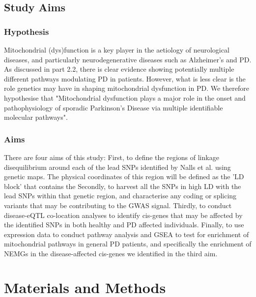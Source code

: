 \documentclass{article}
\begin{document}
\subsection{Study Aims}
\subsubsection{Hypothesis}
Mitochondrial (dys)function is a key player in the aetiology of neurological diseases\cite{Bartman2024MitochondrialDiseases}, and particularly neurodegenerative diseases such as Alzheimer's and PD\cite{MonzioCompagnoni2020TheDisease}. As discussed in part 2.2, there is clear evidence showing potentially multiple different pathways modulating PD in patients. However, what is less clear is the role genetics may have in shaping mitochondrial dysfunction in PD. We therefore hypothesise that "Mitochondrial dysfunction plays a major role in the onset and 
pathophysiology of sporadic Parkinson’s Disease via multiple identifiable molecular pathways". 
\subsubsection{Aims}
There are four aims of this study:
First, to define the regions of linkage disequilibrium around each of the lead SNPs identified by Nalls et al.\cite{Nalls2019IdentificationStudies} using genetic maps. The physical coordinates of this region will be defined as the 'LD block' that contains the 
Secondly, to harvest all the SNPs in high LD with the lead SNPs within that genetic region, and characterise any coding or splicing variants that may be contributing to the GWAS signal.
Thirdly, to conduct disease-eQTL co-location analyses to identify cis-genes that may be affected by the identified SNPs in both healthy and PD affected individuals.
Finally, to use expression data to conduct pathway analysis and GSEA\cite{Subramanian2005GeneProfiles} to test for enrichment of mitochondrial pathways in general PD patients, and specifically the enrichment of NEMGs in the disease-affected cis-genes we identified in the third aim.
\section{Materials and Methods}
\end{document}
